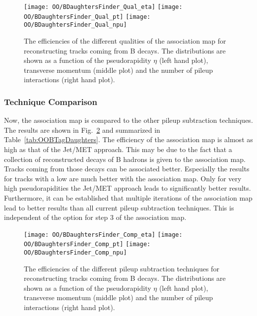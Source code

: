 \begin{figure}[Ht]
  \centering
  \texttt{[image: OO/BDaughtersFinder\_Qual\_eta]}
  \texttt{[image: OO/BDaughtersFinder\_Qual\_pt]}
  \texttt{[image: OO/BDaughtersFinder\_Qual\_npu]}
  \caption[Efficiencies of the different qualities of the association map for reconstructing tracks from B-hadron decays]{The efficiencies of the different qualities of the association map for reconstructing tracks coming from B decays. The distributions are shown as a function of the pseudorapidity $\eta$ (left hand plot), transverse momentum (middle plot) and the number of pileup interactions (right hand plot). \label{plot:OOBTagDaughtersQual}}
\end{figure}



\subsubsection{Technique Comparison \label{sec:OOBTagDaughtersComp}}

Now, the association map is compared to the other pileup subtraction techniques. The results are shown in Fig.~\ref{plot:OOBTagDaughtersComp} and summarized in Table~\ref{tab:OOBTagDaughters}. The efficiency of the association map is almost as high as that of the Jet/MET approach. This may be due to the fact that a collection of reconstructed decays of B hadrons is given to the association map. Tracks coming from those decays can be associated better. Especially the results for tracks with a low \pt are much better with the association map. Only for very high pseudorapidities the Jet/MET approach leads to significantly better results. Furthermore, it can be established that multiple iterations of the association map lead to better results than all current pileup subtraction techniques. This is independent of the option for step 3 of the association map.

\begin{figure}[Ht]
  \centering
  \texttt{[image: OO/BDaughtersFinder\_Comp\_eta]}
  \texttt{[image: OO/BDaughtersFinder\_Comp\_pt]}
  \texttt{[image: OO/BDaughtersFinder\_Comp\_npu]}
  \caption[Efficiencies of the different pileup subtraction techniques for reconstructing tracks from B-hadron decays]{The efficiencies of the different pileup subtraction techniques for reconstructing tracks coming from B decays. The distributions are shown as a function of the pseudorapidity $\eta$ (left hand plot), transverse momentum (middle plot) and the number of pileup interactions (right hand plot). \label{plot:OOBTagDaughtersComp}}
\end{figure}

